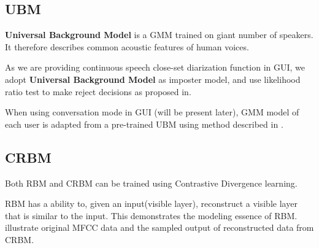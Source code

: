 
\subsection{UBM}

\textbf{Universal Background Model} is a GMM trained on giant number of speakers.
It therefore describes common acoustic features of human voices.\cite{UBM}

As we are providing continuous speech close-set diarization function in
GUI, we adopt \textbf{Universal Background Model} as imposter model,
and use likelihood ratio test to make reject decisions as proposed in\cite{reynolds2000speaker}.

When using conversation mode in GUI (will be present later),
GMM model of each user is adapted from a pre-trained UBM
using method described in \cite{reynolds2000speaker}.

\subsection{CRBM}


			Both RBM and CRBM can be trained using Contrastive Divergence learning.

			RBM has a ability to, given an input(visible layer), reconstruct a visible
			layer that is similar to the input. This demonstrates the modeling essence
			of RBM.  illustrate original MFCC data and the sampled output of
			reconstructed data from CRBM.

